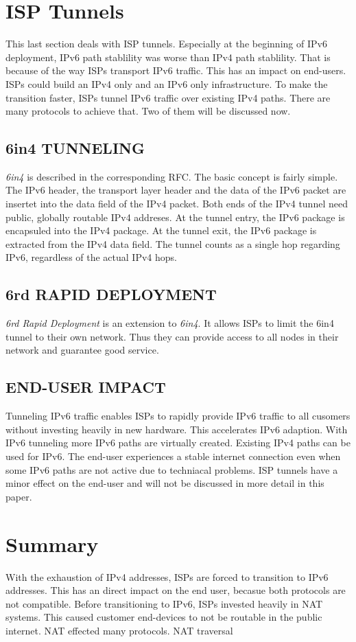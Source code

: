 \documentclass[format=sigconf, natbib=true, nonacm=true]{acmart}
\begin{document}
    \section{ISP Tunnels}
    This last section deals with ISP tunnels. Especially at the beginning of IPv6 deployment, IPv6 path stablility was worse than IPv4 path stablility\cite{7119767}. That is because of the way ISPs transport IPv6 traffic. This has an impact on end-users. ISPs could build an IPv4 only and an IPv6 only infrastructure. To make the transition faster, ISPs tunnel IPv6 traffic over existing IPv4 paths. There are many protocols to achieve that. Two of them will be discussed now.
    \subsection{6in4 TUNNELING}
    \textit{6in4} is described in the corresponding RFC\cite{rfc4213}. The basic concept is fairly simple. The IPv6 header, the transport layer header and the data of the IPv6 packet are insertet into the data field of the IPv4 packet. Both ends of the IPv4 tunnel need public, globally routable IPv4 addreses. At the tunnel entry, the IPv6 package is encapsuled into the IPv4 package. At the tunnel exit, the IPv6 package is extracted from the IPv4 data field. The tunnel counts as a single hop regarding IPv6, regardless of the actual IPv4 hops.
    \subsection{6rd RAPID DEPLOYMENT}
    \textit{6rd Rapid Deployment} is an extension to \textit{6in4}. It allows ISPs to limit the 6in4 tunnel to their own network. Thus they can provide access to all nodes in their network and guarantee good service.
    \subsection*{END-USER IMPACT}
    Tunneling IPv6 traffic enables ISPs to rapidly provide IPv6 traffic to all cusomers without investing heavily in new hardware. This accelerates IPv6 adaption. With IPv6 tunneling more IPv6 paths are virtually created. Existing IPv4 paths can be used for IPv6. The end-user experiences a stable internet connection even when some IPv6 paths are not active due to techniacal problems. ISP tunnels have a minor effect on the end-user and will not be discussed in more detail in this paper.

    \section{Summary}
    With the exhaustion of IPv4 addresses, ISPs are forced to transition to IPv6 addresses. This has an direct impact on the end user, becasue both protocols are not compatible. Before transitioning to IPv6, ISPs invested heavily in NAT systems. This caused customer end-devices to not be routable in the public internet. NAT effected many protocols. NAT traversal 

    
    
\end{document}
